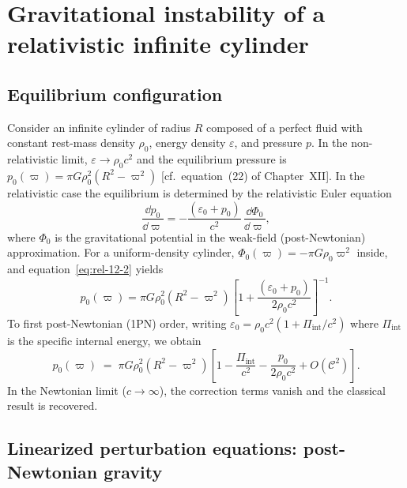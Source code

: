 \section{Gravitational instability of a relativistic infinite cylinder}
\label{sec:rel-12-108}

\subsection{Equilibrium configuration}
\label{sec:rel-12-108a}

Consider an infinite cylinder of radius $R$ composed of a perfect fluid
with constant rest-mass density $\rho_{0}$, energy density
$\varepsilon$, and pressure $p$.  In the non-relativistic limit,
$\varepsilon \to \rho_{0}c^{2}$ and the equilibrium pressure is
$p_{0}(\varpi) = \pi G \rho_{0}^{2}(R^{2}-\varpi^{2})$ [cf.\
equation~(22) of Chapter~XII].  In the relativistic case the
equilibrium is determined by the relativistic Euler equation
\begin{equation}
\label{eq:rel-12-2}
\frac{\dd p_{0}}{\dd \varpi} = -\frac{(\varepsilon_{0}+p_{0})}{c^{2}}
  \,\frac{\dd \Phi_{0}}{\dd \varpi},
\end{equation}
where $\Phi_{0}$ is the gravitational potential in the weak-field
(post-Newtonian) approximation.  For a uniform-density cylinder,
$\Phi_{0}(\varpi) = -\pi G \rho_{0}\varpi^{2}$ inside, and
equation~\eqref{eq:rel-12-2} yields
\begin{equation}
\label{eq:rel-12-3}
p_{0}(\varpi) = \pi G \rho_{0}^{2}(R^{2}-\varpi^{2})
  \left[1 + \frac{(\varepsilon_{0}+p_{0})}{2\rho_{0}c^{2}}\right]^{-1}
  \!\!.
\end{equation}
To first post-Newtonian (1PN) order, writing
$\varepsilon_{0}=\rho_{0}c^{2}(1+\Pi_{\mathrm{int}}/c^{2})$ where
$\Pi_{\mathrm{int}}$ is the specific internal energy, we obtain
\begin{equation}
\label{eq:rel-12-4}
p_{0}(\varpi) \;=\; \pi G\rho_{0}^{2}(R^{2}-\varpi^{2})
  \left[1 - \frac{\Pi_{\mathrm{int}}}{c^{2}}
  - \frac{p_{0}}{2\rho_{0}c^{2}} + O(\mathcal{C}^{2})\right].
\end{equation}
In the Newtonian limit ($c\to\infty$), the correction terms vanish and
the classical result is recovered.

\subsection{Linearized perturbation equations: post-Newtonian gravity}
\label{sec:rel-12-108b}

